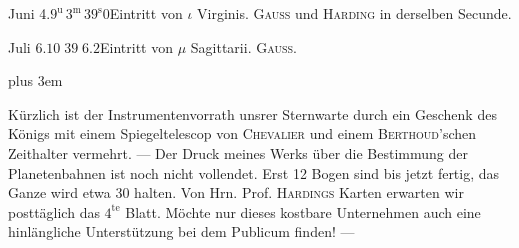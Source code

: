 \smallskip
\noindent Juni 4.\quad $9^{\text{u}}\,3^{\text{m}}\,39^{\text{s}}0$\quad Eintritt von $\iota$ Virginis. \textsc{Gauss} und \textsc{Harding} in derselben Secunde.

\smallskip
\noindent Juli 6.\quad $10\;39\;6.2$\quad Eintritt von $\mu$ Sagittarii. \textsc{Gauss}.

\smallskip
{\rightskip=0pt plus 3em\par\indent Kürzlich ist der Instrumentenvorrath unsrer Sternwarte durch ein Geschenk des Königs mit
einem Spiegeltelescop von \textsc{Chevalier} und einem \textsc{Berthoud}'schen Zeithalter vermehrt. --- Der
Druck meines
Werks über die Bestimmung der Planetenbahnen ist noch nicht vollendet. Erst 12 Bogen sind
bis jetzt fertig, das Ganze wird etwa 30 halten. Von Hrn. Prof. \textsc{Hardings} Karten erwarten
wir posttäglich das $4^{\text{te}}$ Blatt. Möchte nur dieses kostbare Unternehmen auch eine
hinlängliche Unterstützung bei dem Publicum finden! ---\par}
